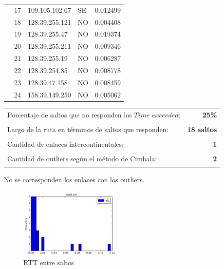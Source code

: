 \begin{center}
{\begin{tabular}{llllr}
        & 17 & 109.105.102.67 & SE &  0.012499 \\
        & 18 & 128.39.255.121 & NO &  0.004408 \\
        & 19 & 128.39.255.47 & NO &  0.019374 \\
        & 20 & 128.39.255.211 & NO &  0.009346 \\
        & 21 & 128.39.255.19 & NO &  0.006287 \\
        & 22 & 128.39.254.85 & NO &  0.008778 \\
        & 23 & 128.39.47.158 & NO &  0.008459 \\
        & 24 & 158.39.149.250 & NO &  0.005062 \\
\bottomrule
\end{tabular}}
\end{center}

\begin{center}
\begin{tabular}{p{6.5cm}r}
Porcentaje de saltos que no responden los $Time$ $exceeded$: & \textbf{25\%} \\ \\ 
Largo de la ruta en términos de saltos que responden: &\textbf{18 saltos} \\ \\
Cantidad de enlaces intercontinentales: & \textbf{1} \\ \\
Cantidad de outliers según el método de Cimbala: & \textbf{2} \\ \\
\end{tabular}
\end{center}

No se corresponden los enlaces con los outliers.

\begin{figure}[H]
  \centering
    \includegraphics[width=0.45\textwidth]{histogramas_rtt/unis-no.png}
  \caption{RTT entre saltos}
  \label{entropia-s}
\end{figure}

\begin{center}

\end{center}

